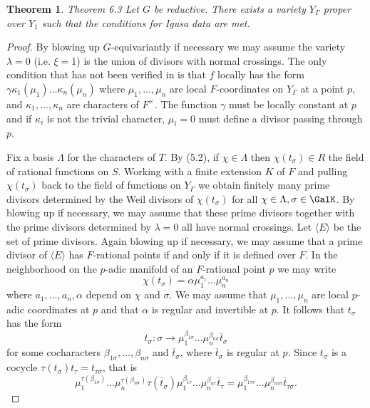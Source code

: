 \documentclass{memo-l}
\newtheorem{theorem}{Theorem}[section]
\theoremstyle{definition}
\theoremstyle{remark}
\numberwithin{section}{chapter}
\numberwithin{equation}{chapter}
\begin{document}
\begin{theorem}{Theorem 6.3}  Let $G$ be reductive.
 There exists a variety $Y_{{\Gamma}}$ proper over $Y_{1}$ such that the
conditions for Igusa data are met.
\end{theorem}

\begin{proof}   By blowing up $G$-equivariantly if necessary we may assume
the variety $\lambda=0$ (i.e. $\xi=1$) is
the union of divisors with normal crossings.
 The only condition that has not been verified in \cite{MR701566} is that $f$ locally
has the form ${\gamma}{\kappa}_{1}({\mu}_{1})\ldots {\kappa}_{n}({\mu}_{n})$
where ${\mu}_{1},\ldots ,{\mu}_{n}$ are local $F$-coordinates on
$Y_{{\Gamma}}$ at a point $p$, and ${\kappa}_{1},\ldots ,{\kappa}_{n}$ are
characters of $F^{\times}$.
 The function ${\gamma}$ must be locally constant at $p$ and if
${\kappa}_{i}$ is not the trivial character, ${\mu}_{i}=0$ must define a
divisor passing through $p$.

   Fix a basis ${\Lambda}$ for the characters of $T$.
 By (5.2), if ${\chi} \in {\Lambda}$ then ${\chi}(t_{{\sigma}}) \in R$
the field of rational functions on $S$.
 Working with a finite extension $K$ of $F$ and pulling ${\chi}(t_{{\sigma}})$
back to the field of functions on $Y_{{\Gamma}}$ we obtain finitely many prime
divisors determined by the Weil divisors of
${\chi}(t_{{\sigma}})$ for all ${\chi} \in {\Lambda}, {\sigma} \in
\GalK$.
 By blowing up if necessary, we may assume that these prime divisors
together with the prime divisors determined by ${\lambda}=0$ all have normal
crossings.
 Let $\langle E\rangle$ be the set of prime divisors.
 Again blowing up if necessary, we may assume that a prime divisor of $\langle E\rangle$
has $F$-rational points if and only if it is defined over $F$.
 In the neighborhood on the $p$-adic manifold of an $F$-rational point $p$
we may write
$$
{\chi}(t_{{\sigma}}) = {\alpha}{\mu}_{1}^{a_1} \ldots {\mu}_{n}^{a_n}
$$
where $a_{1},\ldots ,a_{n},{\alpha}$ depend on ${\chi}$ and ${\sigma}$.
 We may assume that ${\mu}_{1},\ldots ,{\mu}_{n}$ are local $p$-adic
coordinates at $p$ and that ${\alpha}$ is regular and invertible at $p$.
 It follows that $t_{{\sigma}}$ has the form
$$
t_{{\sigma}}: {\sigma} {\to}
{\mu}_{1}^{{\beta}_{1{\sigma}}} \ldots {\mu}_{n}^{{\beta}_{n{\sigma}}}
\overline{t}_{{\sigma}}
$$
for some cocharacters
${\beta}_{1{\sigma}},\ldots ,{\beta}_{n{\sigma}}$ and
$\overline{t}_{{\sigma}}$, where
$\overline{t}_{{\sigma}}$ is regular at $p$.
 Since $t_{{\sigma}}$ is a cocycle ${\tau}(t_{{\sigma}})t_{{\tau}} =
t_{{\tau}{\sigma}}$, that is
$$
\mu_{1}^{\tau({\beta}_{1{\sigma}})} \ldots
{\mu}_{n}^{\tau({\beta}_{n{\sigma}})}
{\tau}(\overline{t}_{{\sigma}}){\mu}_{1}^{{\beta}_{1{\tau}}} \ldots
{\mu}_{n}^{{\beta}_{n{\tau}}} \overline{t}_{{\tau}} =
{\mu}_{1}^{{\beta}_{1{\tau}{\sigma}}}\ldots {\mu}_{n}^{{\beta}_{n{\tau}{\sigma}}}
\overline{t}_{{\tau}{\sigma}}.
$$


\end{proof}
\end{document}
